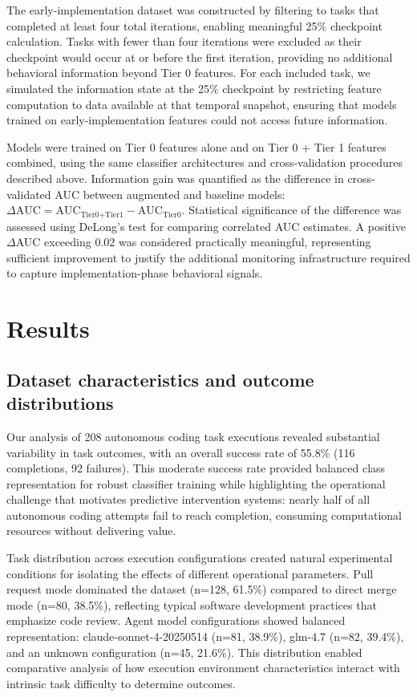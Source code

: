 \documentclass[]{article}
\begin{document}
The early-implementation dataset was constructed by filtering to tasks that completed at least four total iterations, enabling meaningful 25\% checkpoint calculation. Tasks with fewer than four iterations were excluded as their checkpoint would occur at or before the first iteration, providing no additional behavioral information beyond Tier 0 features. For each included task, we simulated the information state at the 25\% checkpoint by restricting feature computation to data available at that temporal snapshot, ensuring that models trained on early-implementation features could not access future information.

Models were trained on Tier 0 features alone and on Tier 0 + Tier 1 features combined, using the same classifier architectures and cross-validation procedures described above. Information gain was quantified as the difference in cross-validated AUC between augmented and baseline models: $\Delta\text{AUC} = \text{AUC}_{\text{Tier0+Tier1}} - \text{AUC}_{\text{Tier0}}$. Statistical significance of the difference was assessed using DeLong's test for comparing correlated AUC estimates. A positive $\Delta$AUC exceeding 0.02 was considered practically meaningful, representing sufficient improvement to justify the additional monitoring infrastructure required to capture implementation-phase behavioral signals.

\section{Results}
\label{sec:results}
\subsection{Dataset characteristics and outcome distributions}

Our analysis of 208 autonomous coding task executions revealed substantial variability in task outcomes, with an overall success rate of 55.8\% (116 completions, 92 failures). This moderate success rate provided balanced class representation for robust classifier training while highlighting the operational challenge that motivates predictive intervention systems: nearly half of all autonomous coding attempts fail to reach completion, consuming computational resources without delivering value.

Task distribution across execution configurations created natural experimental conditions for isolating the effects of different operational parameters. Pull request mode dominated the dataset (n=128, 61.5\%) compared to direct merge mode (n=80, 38.5\%), reflecting typical software development practices that emphasize code review. Agent model configurations showed balanced representation: claude-sonnet-4-20250514 (n=81, 38.9\%), glm-4.7 (n=82, 39.4\%), and an unknown configuration (n=45, 21.6\%). This distribution enabled comparative analysis of how execution environment characteristics interact with intrinsic task difficulty to determine outcomes.
\end{document}
